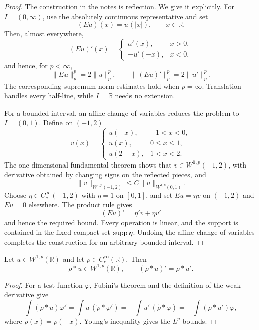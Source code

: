 \begin{proof}
The construction in the notes is reflection.  We give it explicitly.  For
$I=(0,\infty)$, use the absolutely continuous representative and set
\[
  (Eu)(x)=u(|x|),
  \qquad x\in\mathbb R.
\]
Then, almost everywhere,
\[
  (Eu)'(x)=
  \begin{cases}
    u'(x),&x>0,\\
    -u'(-x),&x<0,
  \end{cases}
\]
and hence, for $p<\infty$,
\[
  \|Eu\|_p^p=2\|u\|_p^p,
  \qquad
  \|(Eu)'\|_p^p=2\|u'\|_p^p.
\]
The corresponding supremum-norm estimates hold when $p=\infty$.  Translation
handles every half-line, while $I=\mathbb R$ needs no extension.

For a bounded interval, an affine change of variables reduces the problem to
$I=(0,1)$.  Define on $(-1,2)$
\[
  v(x)=
  \begin{cases}
    u(-x),&-1<x<0,\\
    u(x),&0\le x\le1,\\
    u(2-x),&1<x<2.
  \end{cases}
\]
The one-dimensional fundamental theorem shows that $v\in W^{1,p}(-1,2)$,
with derivative obtained by changing signs on the reflected pieces, and
\[
  \|v\|_{W^{1,p}(-1,2)}\le C\|u\|_{W^{1,p}(0,1)}.
\]
Choose $\eta\in C_c^\infty(-1,2)$ with $\eta=1$ on $[0,1]$, and set
$Eu=\eta v$ on $(-1,2)$ and $Eu=0$ elsewhere.  The product rule gives
\[
  (Eu)'=\eta'v+\eta v'
\]
and hence the required bound.  Every operation is linear, and the support is
contained in the fixed compact set $\operatorname{supp}\eta$.  Undoing the affine change of
variables completes the construction for an arbitrary bounded interval.
\end{proof}

\begin{notelemma}
Let $u\in W^{1,p}(\mathbb R)$ and let $\rho\in C_c^\infty(\mathbb R)$.  Then
\[
  \rho*u\in W^{1,p}(\mathbb R),
  \qquad
  (\rho*u)'=\rho*u'.
\]
\end{notelemma}

\begin{proof}
For a test function $\varphi$, Fubini's theorem and the definition of the weak
derivative give
\[
 \int(\rho*u)\varphi'
 =\int u\,(\widetilde\rho*\varphi')
 =-\int u'\,(\widetilde\rho*\varphi)
 =-\int(\rho*u')\varphi,
\]
where $\widetilde\rho(x)=\rho(-x)$.  Young's inequality gives the $L^p$
bounds.
\end{proof}

